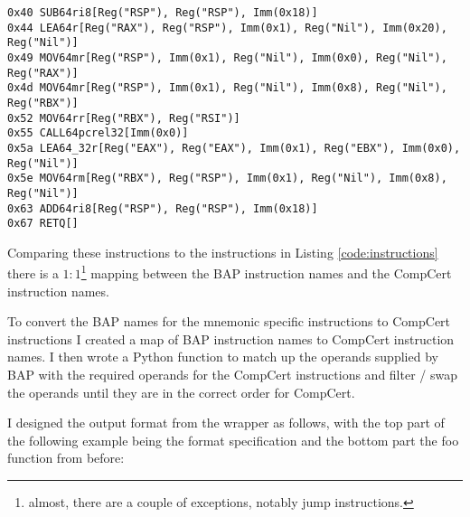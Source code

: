 \begin{lstlisting}[frame=lrbt, numbers=none]
0x40 SUB64ri8[Reg("RSP"), Reg("RSP"), Imm(0x18)]
0x44 LEA64r[Reg("RAX"), Reg("RSP"), Imm(0x1), Reg("Nil"), Imm(0x20), Reg("Nil")]
0x49 MOV64mr[Reg("RSP"), Imm(0x1), Reg("Nil"), Imm(0x0), Reg("Nil"), Reg("RAX")]
0x4d MOV64mr[Reg("RSP"), Imm(0x1), Reg("Nil"), Imm(0x8), Reg("Nil"), Reg("RBX")]
0x52 MOV64rr[Reg("RBX"), Reg("RSI")]
0x55 CALL64pcrel32[Imm(0x0)]
0x5a LEA64_32r[Reg("EAX"), Reg("EAX"), Imm(0x1), Reg("EBX"), Imm(0x0), Reg("Nil")]
0x5e MOV64rm[Reg("RBX"), Reg("RSP"), Imm(0x1), Reg("Nil"), Imm(0x8), Reg("Nil")]
0x63 ADD64ri8[Reg("RSP"), Reg("RSP"), Imm(0x18)]
0x67 RETQ[]
\end{lstlisting}

Comparing these instructions to the instructions in Listing \ref{code:instructions} there is a $1:1$\footnote{almost, there are a couple of exceptions, notably jump instructions.} mapping between the BAP instruction names and the CompCert instruction names.

To convert the BAP names for the mnemonic specific instructions to CompCert instructions I created a map of BAP instruction names to CompCert instruction names. I then wrote a Python function to match up the operands supplied by BAP with the required operands for the CompCert instructions and filter / swap the operands until they are in the correct order for CompCert.
 
I designed the output format from the wrapper as follows, with the top part of the following example being the format specification and the bottom part the foo function from before:





